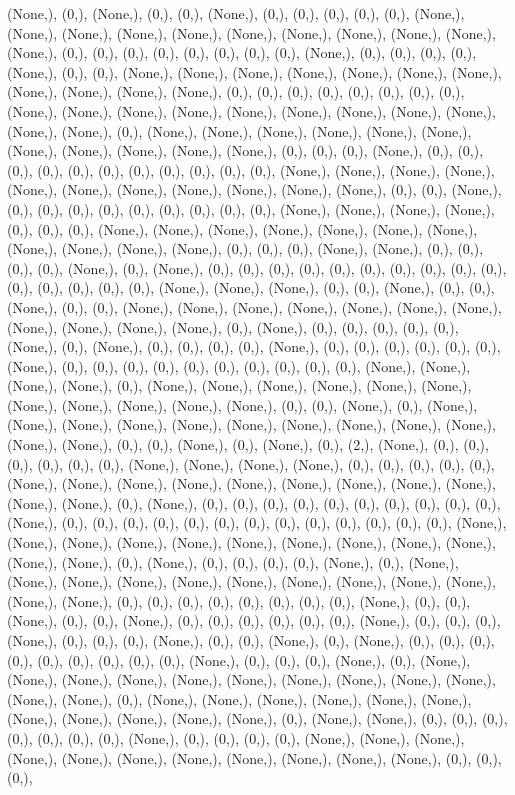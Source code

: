 \documentclass{article}
\begin{document}
(None,), (0,), (None,), (0,), (0,), (None,), (0,), (0,), (0,), (0,), (0,), (None,), (None,), (None,), (None,), (None,), (None,), (None,), (None,), (None,), (None,), (None,), (0,), (0,), (0,), (0,), (0,), (0,), (0,), (0,), (None,), (0,), (0,), (0,), (0,), (None,), (0,), (0,), (None,), (None,), (None,), (None,), (None,), (None,), (None,), (None,), (None,), (None,), (None,), (0,), (0,), (0,), (0,), (0,), (0,), (0,), (0,), (None,), (None,), (None,), (None,), (None,), (None,), (None,), (None,), (None,), (None,), (None,), (0,), (None,), (None,), (None,), (None,), (None,), (None,), (None,), (None,), (None,), (None,), (None,), (0,), (0,), (0,), (None,), (0,), (0,), (0,), (0,), (0,), (0,), (0,), (0,), (0,), (0,), (0,), (None,), (None,), (None,), (None,), (None,), (None,), (None,), (None,), (None,), (None,), (None,), (0,), (0,), (None,), (0,), (0,), (0,), (0,), (0,), (0,), (0,), (0,), (0,), (None,), (None,), (None,), (None,), (0,), (0,), (0,), (None,), (None,), (None,), (None,), (None,), (None,), (None,), (None,), (None,), (None,), (None,), (0,), (0,), (0,), (None,), (None,), (0,), (0,), (0,), (0,), (None,), (0,), (None,), (0,), (0,), (0,), (0,), (0,), (0,), (0,), (0,), (0,), (0,), (0,), (0,), (0,), (0,), (0,), (None,), (None,), (None,), (0,), (0,), (None,), (0,), (0,), (None,), (0,), (0,), (None,), (None,), (None,), (None,), (None,), (None,), (None,), (None,), (None,), (None,), (None,), (0,), (None,), (0,), (0,), (0,), (0,), (0,), (None,), (0,), (None,), (0,), (0,), (0,), (0,), (None,), (0,), (0,), (0,), (0,), (0,), (0,), (None,), (0,), (0,), (0,), (0,), (0,), (0,), (0,), (0,), (0,), (0,), (None,), (None,), (None,), (None,), (0,), (None,), (None,), (None,), (None,), (None,), (None,), (None,), (None,), (None,), (None,), (None,), (0,), (0,), (None,), (0,), (None,), (None,), (None,), (None,), (None,), (None,), (None,), (None,), (None,), (None,), (None,), (None,), (0,), (0,), (None,), (0,), (None,), (0,), (2,), (None,), (0,), (0,), (0,), (0,), (0,), (0,), (None,), (None,), (None,), (None,), (0,), (0,), (0,), (0,), (0,), (None,), (None,), (None,), (None,), (None,), (None,), (None,), (None,), (None,), (None,), (None,), (0,), (None,), (0,), (0,), (0,), (0,), (0,), (0,), (0,), (0,), (0,), (0,), (None,), (0,), (0,), (0,), (0,), (0,), (0,), (0,), (0,), (0,), (0,), (0,), (0,), (0,), (None,), (None,), (None,), (None,), (None,), (None,), (None,), (None,), (None,), (None,), (None,), (None,), (0,), (None,), (0,), (0,), (0,), (0,), (None,), (0,), (None,), (None,), (None,), (None,), (None,), (None,), (None,), (None,), (None,), (None,), (None,), (None,), (0,), (0,), (0,), (0,), (0,), (0,), (0,), (0,), (None,), (0,), (0,), (None,), (0,), (0,), (None,), (0,), (0,), (0,), (0,), (0,), (0,), (None,), (0,), (0,), (0,), (None,), (0,), (0,), (0,), (None,), (0,), (0,), (None,), (0,), (None,), (0,), (0,), (0,), (0,), (0,), (0,), (0,), (0,), (0,), (None,), (0,), (0,), (0,), (None,), (0,), (None,), (None,), (None,), (None,), (None,), (None,), (None,), (None,), (None,), (None,), (None,), (None,), (0,), (None,), (None,), (None,), (None,), (None,), (None,), (None,), (None,), (None,), (None,), (None,), (0,), (None,), (None,), (0,), (0,), (0,), (0,), (0,), (0,), (0,), (None,), (0,), (0,), (0,), (0,), (None,), (None,), (None,), (None,), (None,), (None,), (None,), (None,), (None,), (None,), (None,), (0,), (0,), (0,), 
\end{document}
